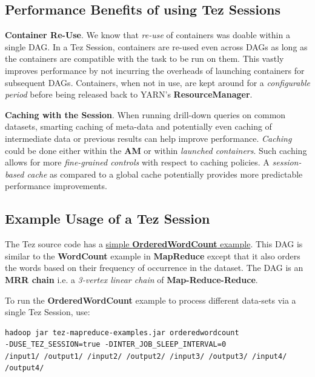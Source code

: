 \documentclass[twocolumn]{article}
\begin{document}
\subsection{Performance Benefits of using Tez Sessions}

\textbf{Container Re-Use}. We know that \emph{re-use} of containers was
doable within a single DAG. In a Tez Session, containers are re-used
even across DAGs as long as the containers are compatible with the task
to be run on them. This vastly improves performance by not incurring the
overheads of launching containers for subsequent DAGs. Containers, when
not in use, are kept around for a \emph{configurable period} before
being released back to YARN's \textbf{ResourceManager}.

\textbf{Caching with the Session}. When running drill-down queries on
common datasets, smarting caching of meta-data and potentially even
caching of intermediate data or previous results can help improve
performance. \emph{Caching} could be done either within the \textbf{AM}
or within \emph{launched containers}. Such caching allows for more
\emph{fine-grained controls} with respect to caching policies. A
\emph{session-based cache} as compared to a global cache potentially
provides more predictable performance improvements.

\subsection{Example Usage of a Tez Session}

The Tez source code has a
\href{https://git-wip-us.apache.org/repos/asf?p=incubator-tez.git;a=blob_plain;f=tez-mapreduce-examples/src/main/java/org/apache/tez/mapreduce/examples/OrderedWordCount.java;hb=master}{simple
\textbf{OrderedWordCount} example}. This DAG is similar to the
\textbf{WordCount} example in \textbf{MapReduce} except that it also
orders the words based on their frequency of occurrence in the dataset.
The DAG is an \textbf{MRR chain} i.e. a \emph{3-vertex linear chain} of
\textbf{Map-Reduce-Reduce}.

To run the \textbf{OrderedWordCount} example to process different
data-sets via a single Tez Session, use:

{\tiny
\begin{verbatim}
hadoop jar tez-mapreduce-examples.jar orderedwordcount 
-DUSE_TEZ_SESSION=true -DINTER_JOB_SLEEP_INTERVAL=0
/input1/ /output1/ /input2/ /output2/ /input3/ /output3/ /input4/ /output4/
\end{verbatim}
}
\end{document}

